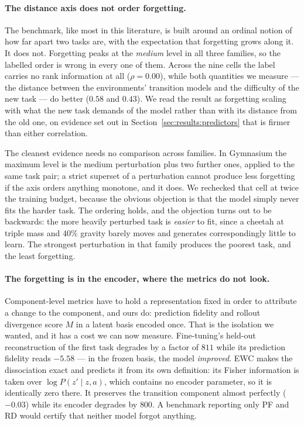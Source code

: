 \paragraph{The distance axis does not order forgetting.} The benchmark, like
most in this literature, is built around an ordinal notion of how far apart two
tasks are, with the expectation that forgetting grows along it. It does not.
Forgetting peaks at the \emph{medium} level in all three families, so the
labelled order is wrong in every one of them. Across the nine cells the label
carries no rank information at all ($\rho = 0.00$), while both quantities we
measure --- the distance between the environments' transition models and the
difficulty of the new task --- do better ($0.58$ and $0.43$). We read the result
as forgetting scaling with what the new task demands of the model rather than
with its distance from the old one, on evidence set out in
Section~\ref{sec:results:predictors} that is firmer than either correlation.

The cleanest evidence needs no comparison across families. In Gymnasium the
maximum level is the medium perturbation plus two further ones, applied to the
same task pair; a strict superset of a perturbation cannot produce less
forgetting if the axis orders anything monotone, and it does. We rechecked that
cell at twice the training budget, because the obvious objection is that the
model simply never fits the harder task. The ordering holds, and the objection
turns out to be backwards: the more heavily perturbed task is \emph{easier} to
fit, since a cheetah at triple mass and $40\%$ gravity barely moves and
generates correspondingly little to learn. The strongest perturbation in that
family produces the poorest task, and the least forgetting.

\paragraph{The forgetting is in the encoder, where the metrics do not look.}
Component-level metrics have to hold a representation fixed in order to
attribute a change to the component, and ours do: prediction fidelity and
rollout divergence score $M$ in a latent basis encoded once. That is the
isolation we wanted, and it has a cost we can now measure. Fine-tuning's
held-out reconstruction of the first task degrades by a factor of $811$ while
its prediction fidelity reads $-5.58$ --- in the frozen basis, the model
\emph{improved}. EWC makes the dissociation exact and predicts it from its own
definition: its Fisher information is taken over $\log P(z' \mid z, a)$, which
contains no encoder parameter, so it is identically zero there. It preserves
the transition component almost perfectly ($-0.03$) while its encoder degrades
by $800$. A benchmark reporting only PF and RD would certify that neither model
forgot anything.

